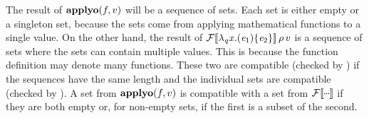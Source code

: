 The result of $\textbf{applyo}(f,v)$ will be a sequence of sets.
Each set is either empty or a singleton set, because the sets come from applying
mathematical functions to a single value.
On the other hand, the result of $\mathcal{F}\llbracket \lambda_{\mathit{q}}\mathit{x}.(\mathit{e}_{\mathrm{1}})\{\mathit{e}_{\mathrm{2}}\} \rrbracket\, \rho \, v$ is a sequence
of sets where the sets can contain multiple values.  This is because the function definition may
denote many functions.
These two are compatible (checked by \seqcompat) if the sequences have the same length and the
individual sets are compatible (checked by \setcompat).
A set from $\textbf{applyo}(f,v)$ is compatible with a set from $\semap{F}{\mydots}$ if they are
both empty or, for non-empty sets, if the first is a subset of the second.


